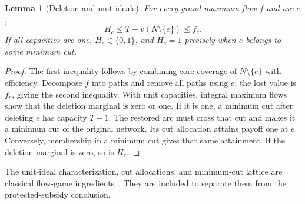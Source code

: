 \documentclass[11pt]{article}
\newtheorem{lemma}[theorem]{Lemma}
\theoremstyle{remark}
\begin{document}
\begin{lemma}[Deletion and unit ideals]\label{flow:ideals}
For every grand maximum flow $f$ and arc $e$,
\[
                    H_e\le T-v(N\setminus\{e\})\le f_e.
\]
If all capacities are one, $H_e\in\{0,1\}$, and $H_e=1$ precisely
when $e$ belongs to some minimum cut.
\end{lemma}
\begin{proof}
The first inequality follows by combining core coverage of
$N\setminus\{e\}$ with efficiency. Decompose $f$ into paths and remove
all paths using $e$; the lost value is $f_e$, giving the second inequality.
With unit capacities, integral maximum flows show that the deletion
marginal is zero or one. If it is one, a minimum cut after deleting $e$
has capacity $T-1$. The restored arc must cross that cut and makes it a
minimum cut of the original network. Its cut allocation attains payoff
one at $e$. Conversely, membership in a minimum cut gives that same
attainment. If the deletion marginal is zero, so is $H_e$.
\end{proof}
The unit-ideal characterization, cut allocations, and minimum-cut lattice
are classical flow-game ingredients~\cite{flow:Fang2010,flow:KalaiZemel1980}.
They are included to separate them from the protected-subsidy conclusion.
\end{document}
